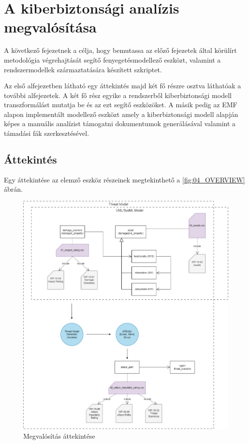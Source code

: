 \chapter{A kiberbiztonsági analízis megvalósítása}
A következő fejezetnek a célja, hogy bemutassa az előző fejezetek által körülírt metodológia végrehajtását segítő fenyegetésmodellező eszközt, valamint a rendszermodellek származtatására készített szkriptet.

Az első alfejezetben látható egy áttekintés majd két fő részre osztva láthatóak a további alfejezetek. A két fő rész egyike a rendszerből kiberbiztonsági modell transzformálást mutatja be és az ezt segítő eszközöket. A másik pedig az EMF alapon implementált modellező eszközt amely a kiberbiztonsági modell alapján képes a manuális analízist támogatni dokumentumok generálásával valamint a támadási fák szerkesztésével.

\section{Áttekintés}

Egy áttekintése az elemző eszköz részeinek megtekinthető a \ref{fig:04_OVERVIEW} ábrán.

\begin{figure}[!ht]
	\centering
	\includegraphics[width=130mm, keepaspectratio]{figures/05_overview.png}
	\caption{Megvalósítás áttekintése}
	\label{fig:05_OVERVIEW}
\end{figure}

